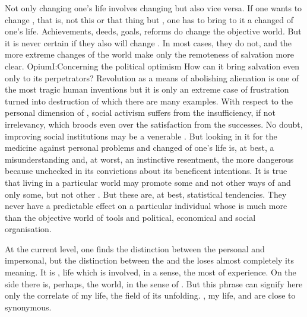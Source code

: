 \pa Not only changing one's life involves changing  but also vice
versa.  If one wants to change , that is, not this or that thing
but , one has to bring to it a changed  of one's life.
Achievements, deeds, goals, reforms do change the {objective world}. But it is
never certain if they also will change . In most cases, they do
not, and the more extreme changes of the world make only the remoteness of
salvation more clear. \citet{How can an event which, like war, eliminates
  discussion and opens every possibility by denying every norm, bring salvation
  to humanity?}{Opium}{I:Concerning the political optimism} How can
it bring salvation even only to its perpetrators?  Revolution as a means of
abolishing alienation is one of the most tragic human inventions but it is only
an extreme case of frustration turned into destruction of which there are many
examples. With respect to the personal dimension of , social
activism suffers from the insufficiency, if not irrelevancy, 
which broods even over the satisfaction from the  
successes.  No doubt, improving social institutions may be a venerable
. But looking in it for the medicine against personal problems and
changed  of one's life is, at best, a misunderstanding and, at
worst, an instinctive resentment, the more dangerous because unchecked in its
convictions about its beneficent intentions. It is true that living in a particular
world may promote some and not other ways of  and only some,
but not other .  But these are, at best, statistical
tendencies. They never have a predictable effect on a particular individual
whose  is much more than the {objective world} of tools and political,
economical and social organisation.



\pa At the current level, one finds the distinction between the personal and
impersonal, but the distinction between the  and the
 loses almost completely its meaning.
 It is ,  life
which is involved, in a sense, the most   of
experience. On 
the  side there is, perhaps, the world, in the sense of
. But this phrase can signify here only the correlate
of {my life}, the field of its unfolding.  , {my life},
 and  are close to synonymous.
 
